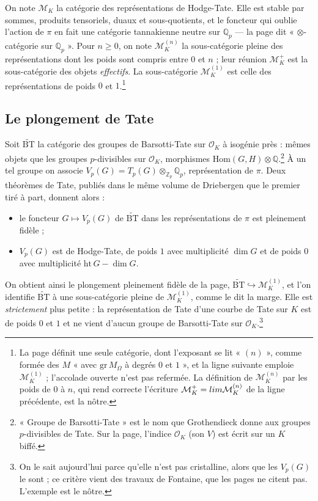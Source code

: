\documentclass[11pt,a4paper]{article}
\begin{document}
On note $\mathcal{M}_K$ la catégorie des représentations de Hodge-Tate. Elle
est stable par sommes, produits tensoriels, duaux et sous-quotients, et le
foncteur qui oublie l'action de $\pi$ en fait une catégorie tannakienne
neutre sur $\mathbb{Q}_p$ --- la page dit « $\otimes$-catégorie sur
$\mathbb{Q}_p$ ». Pour $n \geqslant 0$, on note $\mathcal{M}^{(n)}_K$ la
sous-catégorie pleine des représentations dont les poids sont compris entre
$0$ et $n$ ; leur réunion $\mathcal{M}^{+}_K$ est la sous-catégorie des
objets \emph{effectifs}. La sous-catégorie $\mathcal{M}^{(1)}_K$ est celle des
représentations de poids $0$ et $1$.\footnote{La page définit une seule
catégorie, dont l'exposant se lit « $(n)$ », comme formée des $M$ « avec
$\mathrm{gr}\, M_{\Omega}$ à degrés $0$ et $1$ », et la ligne suivante
emploie $\mathcal{M}^{(1)}_K$ ; l'accolade ouverte n'est pas refermée. La
définition de $\mathcal{M}^{(n)}_K$ par les poids de $0$ à $n$, qui rend
correcte l'écriture $\mathcal{M}^{+}_K = \varinjlim \mathcal{M}^{(n)}_K$ de la
ligne précédente, est la nôtre.}

\subsection*{Le plongement de Tate}

Soit $\widetilde{\mathrm{BT}}$ la catégorie des groupes de Barsotti-Tate sur
$\mathcal{O}_K$ à isogénie près : mêmes objets que les groupes
$p$-divisibles sur $\mathcal{O}_K$, morphismes
$\mathrm{Hom}(G, H) \otimes \mathbb{Q}$.\footnote{« Groupe de Barsotti-Tate »
est le nom que Grothendieck donne aux groupes $p$-divisibles de Tate. Sur la
page, l'indice $\mathcal{O}_K$ (son $V$) est écrit sur un $K$ biffé.} À un tel
groupe on associe $V_p(G) = T_p(G) \otimes_{\mathbb{Z}_p} \mathbb{Q}_p$,
représentation de $\pi$. Deux théorèmes de Tate, publiés dans le même volume
de Driebergen que le premier tiré à part, donnent alors :

\begin{itemize}
  \item le foncteur $G \mapsto V_p(G)$ de $\widetilde{\mathrm{BT}}$ dans les
  représentations de $\pi$ est pleinement fidèle ;
  \item $V_p(G)$ est de Hodge-Tate, de poids $1$ avec multiplicité
  $\dim G$ et de poids $0$ avec multiplicité $\mathrm{ht}\, G - \dim G$.
\end{itemize}

On obtient ainsi le plongement pleinement fidèle de la page,
$\widetilde{\mathrm{BT}} \hookrightarrow \mathcal{M}^{(1)}_K$, et l'on
identifie $\widetilde{\mathrm{BT}}$ à une sous-catégorie pleine de
$\mathcal{M}^{(1)}_K$, comme le dit la marge. Elle est \emph{strictement}
plus petite : la représentation de Tate d'une courbe de Tate sur $K$ est de
poids $0$ et $1$ et ne vient d'aucun groupe de Barsotti-Tate sur
$\mathcal{O}_K$.\footnote{On le sait aujourd'hui parce qu'elle n'est pas
cristalline, alors que les $V_p(G)$ le sont ; ce critère vient des travaux de
Fontaine, que les pages ne citent pas. L'exemple est le nôtre.}
\end{document}
